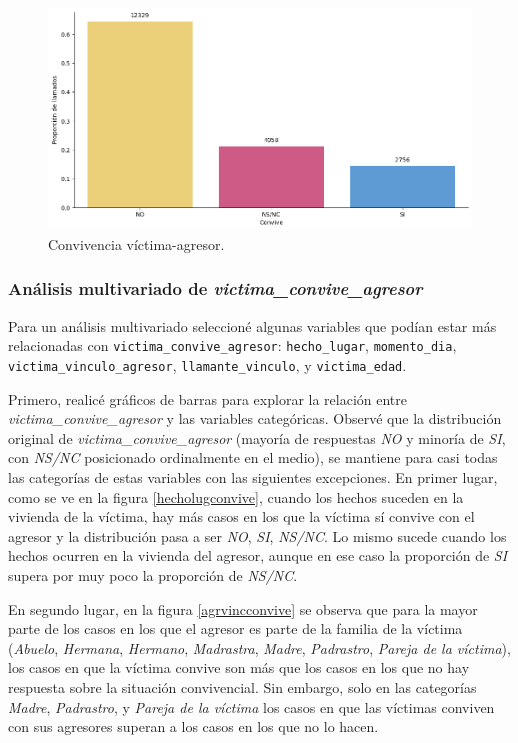 \documentclass[10 pt]{article}
\begin{document}
\begin{figure}[H]
    \begin{center}
    \includegraphics[scale=.5]{images/latex_convive.png}
    \caption{Convivencia víctima-agresor.}
    \label{convivencia}
    \end{center}
    \end{figure}


\subsubsection{Análisis multivariado de \textit{victima\_convive\_agresor}}\label{faltantes}


Para un análisis multivariado seleccioné algunas variables que podían estar más relacionadas con \texttt{victima\_convive\_agresor}: 
\texttt{hecho\_lugar}, \texttt{momento\_dia}, \texttt{victima\_vinculo\_agresor}, \texttt{llamante\_vinculo}, y \texttt{victima\_edad}. 

Primero, realicé gráficos de barras para explorar la relación entre \textit{victima\_convive\_agresor} y las variables categóricas.
Observé que la distribución original de \textit{victima\_convive\_agresor} (mayoría de respuestas \textit{NO} y minoría de \textit{SI}, con \textit{NS/NC} posicionado ordinalmente en el medio), se mantiene para casi todas las categorías de estas variables con las siguientes excepciones. En primer lugar, como se ve en la figura \ref{hecholugconvive}, cuando los hechos suceden en la vivienda de la víctima, hay más casos en los que la víctima sí convive con el agresor y la distribución pasa a ser \textit{NO}, \textit{SI}, \textit{NS/NC}. Lo mismo sucede cuando los hechos ocurren en la vivienda del agresor, aunque en ese caso la proporción de \textit{SI} supera por muy poco la proporción de \textit{NS/NC}. 

En segundo lugar, en la figura \ref{agrvincconvive} se observa que para la mayor parte de los casos en los que el agresor es parte de la familia de la víctima (\textit{Abuelo}, \textit{Hermana}, \textit{Hermano}, \textit{Madrastra}, \textit{Madre}, \textit{Padrastro}, \textit{Pareja de la víctima}), los casos en que la víctima convive son más que los casos en los que no hay respuesta sobre la situación convivencial. Sin embargo, solo en las categorías \textit{Madre}, \textit{Padrastro}, y \textit{Pareja de la víctima} los casos en que las víctimas conviven con sus agresores superan a los casos en los que no lo hacen.
\end{document}
